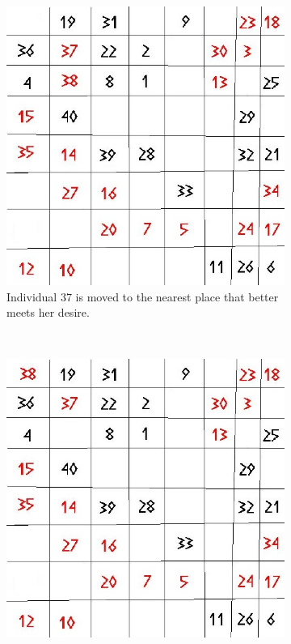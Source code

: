 \begin{figure}[H]
    \begin{subfigure}{0.3\textwidth}
        \includegraphics[width=\textwidth]{Tegenvoorbeeld/segregation_tegenvb_1.jpg}
        \caption{Individual $37$ is moved to the nearest place that better meets her desire. }
        \label{fig:movement2}
    \end{subfigure}
    ~ %
    \begin{subfigure}{0.3\textwidth}
        \includegraphics[width=\textwidth]{Tegenvoorbeeld/segregation_tegenvb_2.jpg}

\end{subfigure}
\end{figure}

